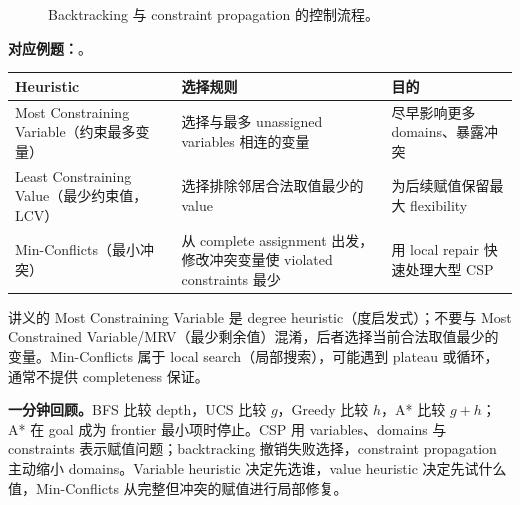 \begin{figure}[htbp]
  \centering
  \resizebox{0.96\textwidth}{!}{}
  \caption{Backtracking 与 constraint propagation 的控制流程。}
  \label{fig:sc3000-l02-csp-flow}
\end{figure}

\textbf{对应例题：}。


\begin{center}
\small
\begin{tabularx}{\textwidth}{@{}>{\raggedright\arraybackslash}p{4.0cm}XX@{}}
  \toprule
  Heuristic & 选择规则 & 目的 \\
  \midrule
  Most Constraining Variable（约束最多变量） & 选择与最多 unassigned variables 相连的变量 & 尽早影响更多 domains、暴露冲突 \\
  Least Constraining Value（最少约束值，LCV） & 选择排除邻居合法取值最少的 value & 为后续赋值保留最大 flexibility \\
  Min-Conflicts（最小冲突） & 从 complete assignment 出发，修改冲突变量使 violated constraints 最少 & 用 local repair 快速处理大型 CSP \\
  \bottomrule
\end{tabularx}
\end{center}

讲义的 Most Constraining Variable 是 degree heuristic（度启发式）；不要与 Most Constrained Variable/MRV（最少剩余值）混淆，后者选择当前合法取值最少的变量。Min-Conflicts 属于 local search（局部搜索），可能遇到 plateau 或循环，通常不提供 completeness 保证。

\textbf{一分钟回顾。}BFS 比较 depth，UCS 比较 $g$，Greedy 比较 $h$，A* 比较 $g+h$；A* 在 goal 成为 frontier 最小项时停止。CSP 用 variables、domains 与 constraints 表示赋值问题；backtracking 撤销失败选择，constraint propagation 主动缩小 domains。Variable heuristic 决定先选谁，value heuristic 决定先试什么值，Min-Conflicts 从完整但冲突的赋值进行局部修复。
